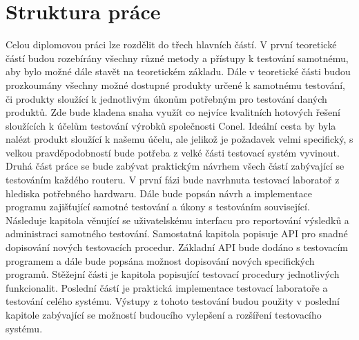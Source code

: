 \section{Struktura práce}
Celou diplomovou práci lze rozdělit do třech hlavních částí. V první teoretické částí budou rozebírány všechny různé metody a přístupy k testování samotnému, aby bylo možné dále stavět na teoretickém základu. Dále v teoretické části budou prozkoumány všechny možné dostupné produkty určené k samotnému testování, či produkty sloužící k jednotlivým úkonům potřebným pro testování daných produktů. Zde bude kladena snaha využít co nejvíce kvalitních hotových řešení sloužících k účelům testování výrobků společnosti Conel. Ideální cesta by byla nalézt produkt sloužící k našemu účelu, ale jelikož je požadavek velmi specifický, s velkou pravděpodobností bude potřeba z velké části testovací systém vyvinout. Druhá část práce se bude zabývat praktickým návrhem všech částí zabývající se testováním každého routeru. V první fázi bude navrhnuta testovací laboratoř z hlediska potřebného hardwaru. Dále bude popsán návrh a implementace programu zajišťující samotné testování a úkony s testováním související. Následuje kapitola věnující se uživatelskému interfacu pro reportování výsledků a administraci samotného testování. Samostatná kapitola popisuje API pro snadné dopisování nových testovacích procedur. Základní API bude dodáno s testovacím programem a dále bude popsána možnost dopisování nových specifických programů. Stěžejní části je kapitola popisující testovací procedury jednotlivých funkcionalit. Poslední částí je praktická implementace testovací laboratoře a testování celého systému. Výstupy z tohoto testování budou použity v poslední kapitole zabývající se možností budoucího vylepšení a rozšíření testovacího systému.

\endinput
